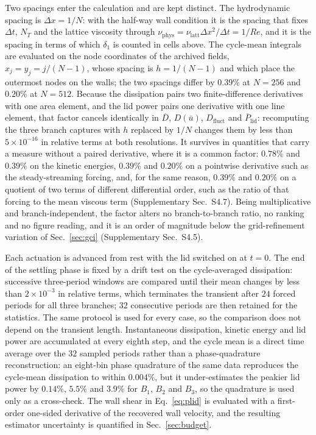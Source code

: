 \documentclass[11pt,a4paper]{article}
\begin{document}
Two spacings enter the calculation and are kept distinct. The hydrodynamic
spacing is $\Delta x=1/N$: with the half-way wall condition it is the spacing that
fixes $\Delta t$, $N_T$ and the lattice viscosity through
$\nu_{\mathrm{phys}}=\nu_{\mathrm{latt}}\Delta x^{2}/\Delta t=1/Re$, and it is the
spacing in terms of which $\delta_1$ is counted in cells above. The cycle-mean
integrals are evaluated on the node coordinates of the archived fields,
$x_j=y_j=j/(N-1)$, whose spacing is $h=1/(N-1)$ and which place the outermost nodes
on the walls; the two spacings differ by $0.39\%$ at $N=256$ and $0.20\%$ at
$N=512$. Because the dissipation pairs two finite-difference derivatives with one
area element, and the lid power pairs one derivative with one line element, that
factor cancels identically in
$\overline{D}$, $D(\bar{u})$, $D_{\mathrm{fluct}}$ and
$\overline{P}_{\mathrm{lid}}$: recomputing the three branch captures with $h$
replaced by $1/N$ changes them by less than $5\times10^{-16}$ in relative terms at
both resolutions. It survives in quantities that carry a measure without a
paired derivative, where it is a common factor: $0.78\%$ and $0.39\%$ on the kinetic
energies, $0.39\%$ and $0.20\%$ on a pointwise derivative such as the
steady-streaming forcing, and, for the same reason, $0.39\%$ and $0.20\%$ on a
quotient of two terms of different differential order, such as the ratio of that
forcing to the mean viscous term (Supplementary Sec.~S4.7). Being multiplicative and
branch-independent, the factor alters no
branch-to-branch ratio, no ranking and no figure reading, and it is an order of
magnitude below the
grid-refinement variation of Sec.~\ref{sec:gci} (Supplementary Sec.~S4.5).

Each actuation is advanced from rest with the lid switched on at $t=0$. The end of
the settling phase is fixed by a drift test on the cycle-averaged dissipation:
successive three-period windows are compared until their mean changes by less than
$2\times10^{-3}$ in relative terms, which terminates the transient after $24$
forced periods for all three branches; $32$ consecutive periods are then retained
for the statistics. The same protocol is used for every case, so the comparison
does not depend on the transient length. Instantaneous dissipation, kinetic energy
and lid power are accumulated at every eighth step, and the cycle mean is a direct
time average over the $32$ sampled periods rather than a phase-quadrature
reconstruction: an eight-bin phase quadrature of the same data reproduces the
cycle-mean dissipation to within $0.004\%$, but it under-estimates the peakier lid
power by $0.14\%$, $5.5\%$ and $3.9\%$ for $B_1$, $B_2$ and $B_3$, so the
quadrature is used only as a cross-check. The wall
shear in Eq.~\eqref{eq:plid} is evaluated with a first-order one-sided derivative
of the recovered wall velocity, and the resulting estimator uncertainty
is quantified in Sec.~\ref{sec:budget}.
\end{document}
